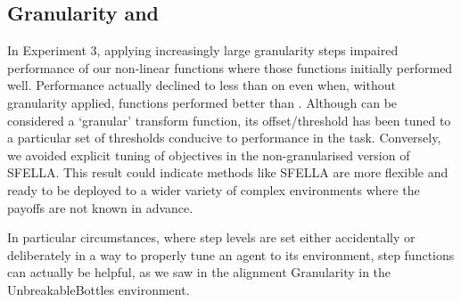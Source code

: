








\subsection{Granularity and \tloA{}}

In Experiment 3, applying increasingly large granularity steps impaired performance of our non-linear functions where those functions initially performed well. Performance actually declined to less than \tloA{} on even when, without granularity applied, functions performed better than \tloA{}. Although \tloA{} can be considered a `granular' transform function, its offset/threshold has been tuned to a particular set of thresholds conducive to performance in the task. Conversely, we avoided explicit tuning of objectives in the non-granularised version of SFELLA. This result could indicate methods like SFELLA are more flexible and ready to be deployed to a wider variety of complex environments where the payoffs are not known in advance.

In particular circumstances, where step levels are set either accidentally or deliberately in a way to properly tune an agent to its environment, step functions can actually be helpful, as we saw in the alignment Granularity in the UnbreakableBottles environment.


